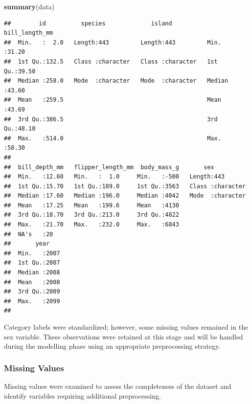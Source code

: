 \documentclass[
]{article}
\newenvironment{Shaded}{\begin{snugshade}}{\end{snugshade}}
\newcommand{\FunctionTok}[1]{\textcolor[rgb]{0.13,0.29,0.53}{\textbf{#1}}}
\newcommand{\NormalTok}[1]{#1}
\begin{document}
\begin{Shaded}
\begin{Highlighting}[]
\FunctionTok{summary}\NormalTok{(data)}
\end{Highlighting}
\end{Shaded}

\begin{verbatim}
##        id          species             island          bill_length_mm 
##  Min.   :  2.0   Length:443         Length:443         Min.   :31.20  
##  1st Qu.:132.5   Class :character   Class :character   1st Qu.:39.50  
##  Median :258.0   Mode  :character   Mode  :character   Median :43.60  
##  Mean   :259.5                                         Mean   :43.69  
##  3rd Qu.:386.5                                         3rd Qu.:48.10  
##  Max.   :514.0                                         Max.   :58.30  
##                                                                       
##  bill_depth_mm   flipper_length_mm  body_mass_g       sex           
##  Min.   :12.60   Min.   :  1.0     Min.   :-500   Length:443        
##  1st Qu.:15.70   1st Qu.:189.0     1st Qu.:3563   Class :character  
##  Median :17.60   Median :196.0     Median :4042   Mode  :character  
##  Mean   :17.25   Mean   :199.6     Mean   :4130                     
##  3rd Qu.:18.70   3rd Qu.:213.0     3rd Qu.:4822                     
##  Max.   :21.70   Max.   :232.0     Max.   :6843                     
##  NA's   :20                                                         
##       year     
##  Min.   :2007  
##  1st Qu.:2007  
##  Median :2008  
##  Mean   :2008  
##  3rd Qu.:2009  
##  Max.   :2099  
## 
\end{verbatim}

Category labels were standardized; however, some missing values remained
in the sex variable. These observations were retained at this stage and
will be handled during the modelling phase using an appropriate
preprocessing strategy.

\subsubsection{Missing Values}\label{missing-values-2}

Missing values were examined to assess the completeness of the dataset
and identify variables requiring additional preprocessing.
\end{document}
